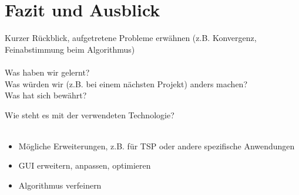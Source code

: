 
\chapter{Fazit und Ausblick}


Kurzer Rückblick, aufgetretene Probleme erwähnen (z.B. Konvergenz, Feinabstimmung beim Algorithmus) \\\\


Was haben wir gelernt? \\

Was würden wir (z.B. bei einem nächsten Projekt) anders machen? \\

Was hat sich bewährt?

Wie steht es mit der verwendeten Technologie? \\\\




\begin{itemize}
\item Mögliche Erweiterungen, z.B. für TSP oder andere spezifische Anwendungen
\item GUI erweitern, anpassen, optimieren
\item Algorithmus verfeinern
\end{itemize}


